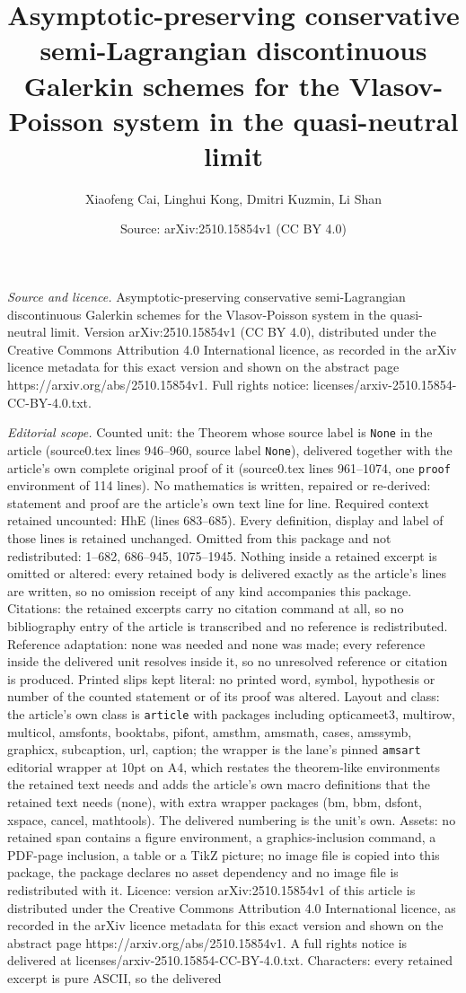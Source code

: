 \documentclass[10pt,a4paper]{amsart}
\title[Asymptotic-preserving conservative semi-Lagrangian discontin]{Asymptotic-preserving conservative semi-Lagrangian discontinuous Galerkin schemes for the Vlasov-Poisson system in the quasi-neutral limit}
\author{Xiaofeng Cai, Linghui Kong, Dmitri Kuzmin, Li Shan}
\date{Source: arXiv:2510.15854v1 (CC BY 4.0)}
\begin{document}
\maketitle

\noindent\emph{Source and licence.} Asymptotic-preserving conservative semi-Lagrangian discontinuous Galerkin schemes for the Vlasov-Poisson system in the quasi-neutral limit. Version arXiv:2510.15854v1 (CC BY 4.0), distributed under the Creative Commons Attribution 4.0 International licence, as recorded in the arXiv licence metadata for this exact version and shown on the abstract page https://arxiv.org/abs/2510.15854v1. Full rights notice: licenses/arxiv-2510.15854-CC-BY-4.0.txt.\par\smallskip

\noindent\textit{Editorial scope.} Counted unit: the Theorem whose source label is \texttt{None} in the article (source0.tex lines 946--960, source label \texttt{None}), delivered together with the article's own complete original proof of it (source0.tex lines 961--1074, one \texttt{proof} environment of 114 lines). No mathematics is written, repaired or re-derived: statement and proof are the article's own text line for line. Required context retained uncounted: HhE (lines 683--685). Every definition, display and label of those lines is retained unchanged. Omitted from this package and not redistributed: 1--682, 686--945, 1075--1945. Nothing inside a retained excerpt is omitted or altered: every retained body is delivered exactly as the article's lines are written, so no omission receipt of any kind accompanies this package. Citations: the retained excerpts carry no citation command at all, so no bibliography entry of the article is transcribed and no reference is redistributed. Reference adaptation: none was needed and none was made; every reference inside the delivered unit resolves inside it, so no unresolved reference or citation is produced. Printed slips kept literal: no printed word, symbol, hypothesis or number of the counted statement or of its proof was altered. Layout and class: the article's own class is \texttt{article} with packages including opticameet3, multirow, multicol, amsfonts, booktabs, pifont, amsthm, amsmath, cases, amssymb, graphicx, subcaption, url, caption; the wrapper is the lane's pinned \texttt{amsart} editorial wrapper at 10pt on A4, which restates the theorem-like environments the retained text needs and adds the article's own macro definitions that the retained text needs (none), with extra wrapper packages (bm, bbm, dsfont, xspace, cancel, mathtools). The delivered numbering is the unit's own. Assets: no retained span contains a figure environment, a graphics-inclusion command, a PDF-page inclusion, a table or a TikZ picture; no image file is copied into this package, the package declares no asset dependency and no image file is redistributed with it. Licence: version arXiv:2510.15854v1 of this article is distributed under the Creative Commons Attribution 4.0 International licence, as recorded in the arXiv licence metadata for this exact version and shown on the abstract page https://arxiv.org/abs/2510.15854v1. A full rights notice is delivered at licenses/arxiv-2510.15854-CC-BY-4.0.txt. Characters: every retained excerpt is pure ASCII, so the delivered 
\end{document}

